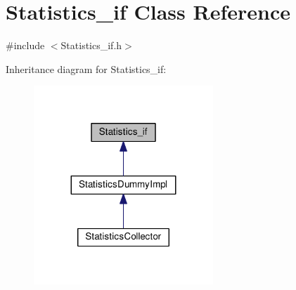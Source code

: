 \hypertarget{class_statistics__if}{}\section{Statistics\+\_\+if Class Reference}
\label{class_statistics__if}


{\ttfamily \#include $<$Statistics\+\_\+if.\+h$>$}



Inheritance diagram for Statistics\+\_\+if\+:
\nopagebreak
\begin{figure}[H]
\begin{center}
\leavevmode
\includegraphics[width=191pt]{class_statistics__if__inherit__graph}
\end{center}
\end{figure}
